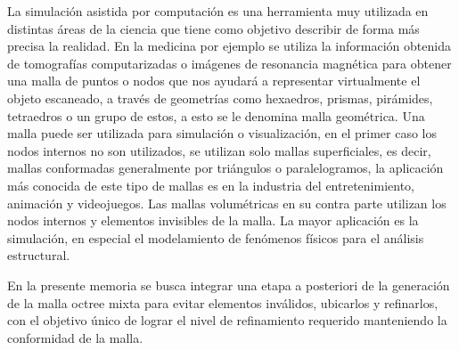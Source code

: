 


La simulación asistida por computación es una herramienta muy utilizada en distintas áreas de la ciencia que tiene como objetivo describir de forma más precisa la realidad. En la medicina por ejemplo se utiliza la información obtenida de tomografías computarizadas o imágenes de resonancia magnética para obtener una malla de puntos o nodos que nos ayudará a representar virtualmente el objeto escaneado, a través de geometrías como hexaedros, prismas, pirámides, tetraedros o un grupo de estos, a esto se le denomina malla geométrica.
Una malla puede ser utilizada para simulación o visualización, en el primer caso los nodos internos no son utilizados, se utilizan solo mallas superficiales, es decir, mallas conformadas generalmente por triángulos o paralelogramos, la aplicación más conocida de este tipo de mallas es en la industria del entretenimiento, animación y videojuegos.
Las mallas volumétricas en su contra parte utilizan los nodos internos y elementos invisibles de la malla. La mayor aplicación es la simulación, en especial el modelamiento de fenómenos físicos para el análisis estructural.

En la presente memoria se busca integrar una etapa a posteriori de la generación de la malla octree mixta para evitar elementos inválidos, ubicarlos y refinarlos, con el objetivo único de lograr el nivel de refinamiento requerido manteniendo la conformidad de la malla. 
 
